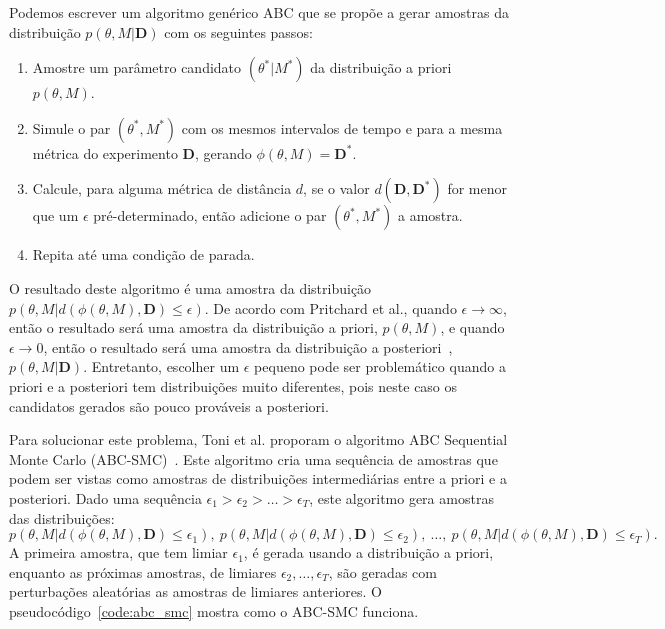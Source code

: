 \documentclass[12pt]{article}
\begin{document}
Podemos escrever um algoritmo genérico ABC que se propõe a gerar 
amostras da distribuição $p(\theta, M | \mathbf{D})$ com os seguintes 
passos:
\begin{enumerate}
    \item Amostre um parâmetro candidato $(\theta^* | M^*)$ da
        distribuição a priori $p(\theta, M)$.
    \item Simule o par $(\theta^*, M^*)$ com os mesmos intervalos de
        tempo e para a mesma métrica do experimento $\mathbf{D}$, 
        gerando $\phi(\theta, M) = \mathbf{D}^*$.
    \item Calcule, para alguma métrica de distância $d$, se o valor $d 
        (\mathbf{D}, \mathbf{D^*})$ for menor que um $\epsilon$
        pré-determinado, então adicione o par $(\theta^*, M^*)$ a 
        amostra.
    \item Repita até uma condição de parada.
\end{enumerate}
O resultado deste algoritmo é uma amostra da distribuição $p (\theta, M
| d(\phi(\theta, M), \mathbf{D}) \leq \epsilon).$ De acordo com
Pritchard et al., quando $\epsilon \to \infty$, então o resultado será
uma amostra da distribuição a priori, $p (\theta, M)$, e quando 
$\epsilon \to 0$, então o resultado será uma amostra da distribuição a
posteriori~\cite{Pritchard1999}, $p (\theta, M | \mathbf{D})$.
Entretanto, escolher um $\epsilon$ pequeno pode ser problemático quando
a priori e a posteriori tem distribuições muito diferentes, pois neste
caso os candidatos gerados são pouco prováveis a posteriori.

Para solucionar este problema, Toni et al. proporam o algoritmo ABC
Sequential Monte Carlo (ABC-SMC)~\cite{Toni2008}. Este algoritmo cria
uma sequência de amostras que podem ser vistas como amostras de
distribuições intermediárias entre a priori e a posteriori. Dado uma
sequência $\epsilon_1 > \epsilon_2 > \ldots > \epsilon_T$, este algoritmo
gera amostras das distribuições:
\begin{equation}
p (\theta, M | d(\phi(\theta, M), \mathbf{D}) \leq \epsilon_1), \
p (\theta, M | d(\phi(\theta, M), \mathbf{D}) \leq \epsilon_2), \ \ldots, \
p (\theta, M | d(\phi(\theta, M), \mathbf{D}) \leq \epsilon_T). \nonumber
\end{equation}
A primeira amostra, que tem limiar $\epsilon_1$, é gerada usando a 
distribuição a priori, enquanto as próximas amostras, de limiares
$\epsilon_2, \ldots, \epsilon_T$, são geradas com perturbações 
aleatórias as amostras de limiares anteriores. O 
pseudocódigo~\ref{code:abc_smc} mostra como o ABC-SMC funciona.
\end{document}
